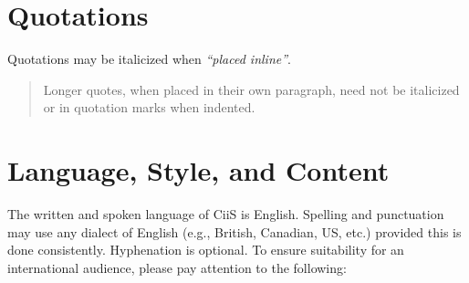 \documentclass{ciis}
\begin{document}
\section{Quotations}
Quotations may be italicized when \textit{``placed inline''}.

\begin{quote}
Longer quotes, when placed in their own paragraph, need not be
italicized or in quotation marks when indented.  
\end{quote}

\section{Language, Style, and Content}

The written and spoken language of CiiS is English. Spelling and
punctuation may use any dialect of English (e.g., British, Canadian,
US, etc.) provided this is done consistently. Hyphenation is
optional. To ensure suitability for an international audience, please
pay attention to the following:
\end{document}
